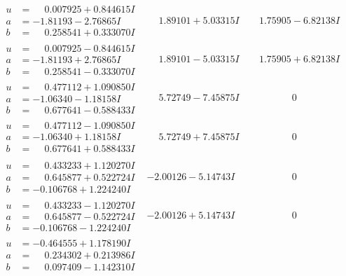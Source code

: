 \documentclass[1p]{elsarticle_modified}
\theoremstyle{definition}
\begin{document}
$$\begin{array}{c|c|c}
\begin{aligned}
u &= \phantom{-}0.007925 + 0.844615 I \\
a &= -1.81193 - 2.76865 I \\
b &= \phantom{-}0.258541 + 0.333070 I\end{aligned}
 & \phantom{-}1.89101 + 5.03315 I & \phantom{-}1.75905 - 6.82138 I \\ \hline\begin{aligned}
u &= \phantom{-}0.007925 - 0.844615 I \\
a &= -1.81193 + 2.76865 I \\
b &= \phantom{-}0.258541 - 0.333070 I\end{aligned}
 & \phantom{-}1.89101 - 5.03315 I & \phantom{-}1.75905 + 6.82138 I \\ \hline\begin{aligned}
u &= \phantom{-}0.477112 + 1.090850 I \\
a &= -1.06340 - 1.18158 I \\
b &= \phantom{-}0.677641 - 0.588433 I\end{aligned}
 & \phantom{-}5.72749 - 7.45875 I & \phantom{-0.000000 } 0 \\ \hline\begin{aligned}
u &= \phantom{-}0.477112 - 1.090850 I \\
a &= -1.06340 + 1.18158 I \\
b &= \phantom{-}0.677641 + 0.588433 I\end{aligned}
 & \phantom{-}5.72749 + 7.45875 I & \phantom{-0.000000 } 0 \\ \hline\begin{aligned}
u &= \phantom{-}0.433233 + 1.120270 I \\
a &= \phantom{-}0.645877 + 0.522724 I \\
b &= -0.106768 + 1.224240 I\end{aligned}
 & -2.00126 - 5.14743 I & \phantom{-0.000000 } 0 \\ \hline\begin{aligned}
u &= \phantom{-}0.433233 - 1.120270 I \\
a &= \phantom{-}0.645877 - 0.522724 I \\
b &= -0.106768 - 1.224240 I\end{aligned}
 & -2.00126 + 5.14743 I & \phantom{-0.000000 } 0 \\ \hline\begin{aligned}
u &= -0.464555 + 1.178190 I \\
a &= \phantom{-}0.234302 + 0.213986 I \\
b &= \phantom{-}0.097409 - 1.142310 I\end{aligned}

\end{array}$$
\end{document}
